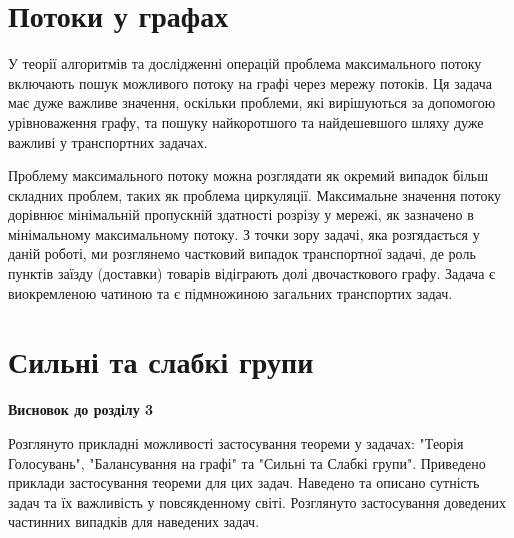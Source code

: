 \section{Потоки у графах}

У теорії алгоритмів та дослідженні операцій проблема максимального потоку включають пошук можливого потоку на графі через мережу потоків. Ця задача має дуже важливе значення, оскільки проблеми, які вирішуються за допомогою урівноваження графу, та пошуку найкоротшого та найдешевшого шляху дуже важливі у транспортних задачах.

Проблему максимального потоку можна розглядати як окремий випадок більш складних проблем, таких як проблема циркуляції. Максимальне значення потоку дорівнює мінімальній пропускній здатності розрізу у мережі, як зазначено в мінімальному максимальному потоку. З точки зору задачі, яка розгядається у даній роботі, ми розглянемо частковий випадок транспортної задачі, де роль пунктів  заїзду (доставки) товарів відіграють долі двочасткового графу. Задача є виокремленою чатиною та є підмножиною загальних транспортих задач.

\section{Сильні та слабкі групи}

\textbf{Висновок до розділу 3}

	Розглянуто прикладні можливості застосування теореми у задачах: "Теорія Голосувань", "Балансування на графі" та "Сильні та Слабкі групи". Приведено приклади застосування теореми для цих задач. Наведено та описано сутність задач та їх важливість у повсякденному світі. Розглянуто застосування доведених частинних випадків для наведених задач.
